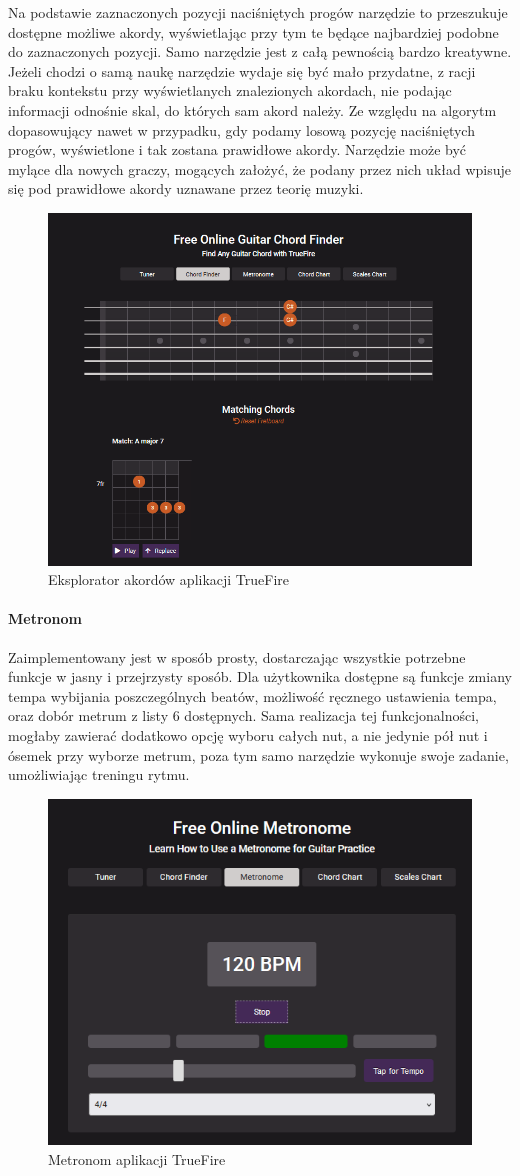 Na podstawie zaznaczonych pozycji naciśniętych progów narzędzie to przeszukuje dostępne możliwe akordy, wyświetlając przy tym te będące najbardziej podobne do zaznaczonych pozycji. Samo narzędzie jest z całą pewnością bardzo kreatywne. Jeżeli chodzi o samą naukę narzędzie wydaje się być mało przydatne, z racji braku kontekstu przy wyświetlanych znalezionych akordach, nie podając informacji odnośnie skal, do których sam akord należy. Ze względu na algorytm dopasowujący nawet w przypadku, gdy podamy losową pozycję naciśniętych progów, wyświetlone i tak zostana prawidłowe akordy. Narzędzie może być mylące dla nowych graczy, mogących założyć, że podany przez nich układ wpisuje się pod prawidłowe akordy uznawane przez teorię muzyki.

\begin{figure}[htb]
	\centering
	\includegraphics[width=.5\linewidth]{rys02/ChordFinder}
	\caption{Eksplorator akordów aplikacji TrueFire} \label{fig:pageLayout}
\end{figure}

\paragraph{Metronom}
Zaimplementowany jest w sposób prosty, dostarczając wszystkie potrzebne funkcje w jasny i przejrzysty sposób. Dla użytkownika dostępne są funkcje zmiany tempa wybijania poszczególnych beatów, możliwość ręcznego ustawienia tempa, oraz dobór metrum z listy 6 dostępnych. Sama realizacja tej funkcjonalności, mogłaby zawierać dodatkowo opcję wyboru całych nut, a nie jedynie pół nut i ósemek przy wyborze metrum, poza tym samo narzędzie wykonuje swoje zadanie, umożliwiając treningu rytmu.

\begin{figure}[htb]
	\centering
	\includegraphics[width=.4\linewidth]{rys02/METRO}
	\caption{Metronom aplikacji TrueFire} \label{fig:pageLayout}
\end{figure}

